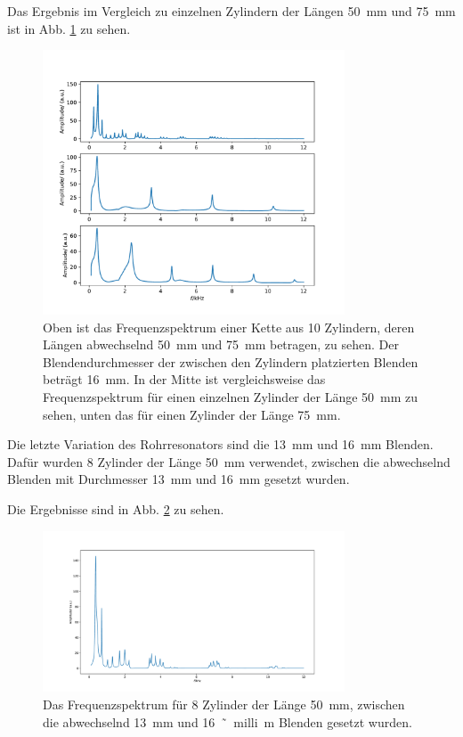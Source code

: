 Das Ergebnis im Vergleich zu einzelnen Zylindern der Längen \SI{50}{\milli\metre} und \SI{75}{\milli\metre} ist in Abb. \ref{fig:var4} zu sehen. 
\begin{figure}
    \centering
    \includegraphics[width=0.8\textwidth]{plots/B_5.pdf}
    \caption{Oben ist das Frequenzspektrum einer Kette aus 10 Zylindern, deren Längen abwechselnd \SI{50}{\milli\metre} und \SI{75}{\milli\metre} betragen, zu sehen. Der Blendendurchmesser der zwischen den Zylindern platzierten Blenden beträgt \SI{16}{\milli\metre}. In der Mitte ist vergleichsweise das Frequenzspektrum für einen einzelnen Zylinder der Länge \SI{50}{\milli\metre} zu sehen, unten das für einen Zylinder der Länge \SI{75}{\milli\metre}.}
    \label{fig:var4}
\end{figure}

Die letzte Variation des Rohrresonators sind die \SI{13}{\milli\meter} und \SI{16}{\milli\meter} Blenden. Dafür wurden \num{8} Zylinder der Länge \SI{50}{\milli\metre} verwendet, zwischen die abwechselnd Blenden mit Durchmesser \SI{13}{\milli\metre} und \SI{16}{\milli\metre} gesetzt wurden. 

Die Ergebnisse sind in Abb. \ref{fig:var5} zu sehen.
\begin{figure}
    \centering
    \includegraphics[width=0.8\textwidth]{plots/B_6.pdf}
    \caption{Das Frequenzspektrum für 8 Zylinder der Länge \SI{50}{\milli\metre}, zwischen die abwechselnd \SI{13}{\milli\metre} und \SI{16}{˜milli\metre} Blenden gesetzt wurden.}
    \label{fig:var5}
\end{figure}



